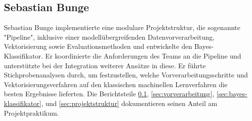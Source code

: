 \subsection{Sebastian Bunge}
\label{sec:sebastian}

Sebastian Bunge implementierte eine modulare Projektstruktur, die sogenannte "Pipeline", inklusive einer modellübergreifenden Datenvorverarbeitung, Vektorisierung sowie Evaluationsmethoden und entwickelte den Bayes-Klassifikator. Er koordinierte die Anforderungen des Teams an die Pipeline und unterstützte bei der Integration weiterer Ansätze in diese. Er führte Stichprobenanalysen durch, um festzustellen, welche Vorverarbeitungsschritte und Vektorisierungsverfahren auf den klassischen machinellen Lernverfahren die besten Ergebnisse lieferten. Die Berichtsteile \ref{sec:sebastian}, \ref{sec:vorverarbeitung}, \ref{sec:bayes-klassifikator}, und \ref{sec:projektstruktur} dokumentieren seinen Anteil am Projektpraktikum.
